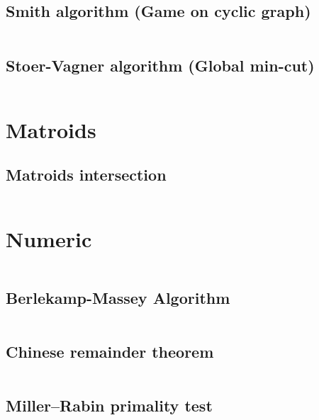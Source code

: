 \documentclass{article}
\begin{document}
\subsection{Smith algorithm (Game on cyclic graph)}
\inputminted[mathescape, breaklines, breakafter=(, tabsize=2, frame=lines, showtabs, tab=|\ , tabcolor=lightgray]{c++}{./graphs/smith/smith.cpp}
\subsection{Stoer-Vagner algorithm (Global min-cut)}
\inputminted[mathescape, breaklines, breakafter=(, tabsize=2, frame=lines, showtabs, tab=|\ , tabcolor=lightgray]{c++}{./graphs/stoer-vagner/stoer-vagner.cpp}
\section{Matroids}
\subsection{Matroids intersection}
\inputminted[mathescape, breaklines, breakafter=(, tabsize=2, frame=lines, showtabs, tab=|\ , tabcolor=lightgray]{c++}{./matroids/matroids-intersection/matroids-intersection.cpp}
\section{Numeric}
\inputminted[mathescape, breaklines, breakafter=(, tabsize=2, frame=lines, showtabs, tab=|\ , tabcolor=lightgray]{c++}{./numeric/mod-ineq-first-sol.cpp}
\subsection{Berlekamp-Massey Algorithm}
\inputminted[mathescape, breaklines, breakafter=(, tabsize=2, frame=lines, showtabs, tab=|\ , tabcolor=lightgray]{c++}{./numeric/berlekamp/berlekamp.cpp}
\subsection{Chinese remainder theorem}
\inputminted[mathescape, breaklines, breakafter=(, tabsize=2, frame=lines, showtabs, tab=|\ , tabcolor=lightgray]{c++}{./numeric/chinese-remainder-theorem/chinese-remainder-theorem.cpp}
\subsection{Miller–Rabin primality test}
\inputminted[mathescape, breaklines, breakafter=(, tabsize=2, frame=lines, showtabs, tab=|\ , tabcolor=lightgray]{c++}{./numeric/miller-rabin/miller-rabin.cpp}
\end{document}
